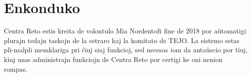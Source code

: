 \section{Enkonduko}
Centra Reto estis kreita de volontulo Mia Nordentoft fine de 2018 por aŭtomat\-igi plurajn tedajn taskojn de la estraro kaj la komitato de TEJO. La sistemo estas pli-malpli memklariga pri ĉiuj siaj funkcioj, sed necesas iom da antaŭscio por tiuj, kiuj uzas administrajn funkciojn de Centra Reto por certigi ke oni nenion rompas.
